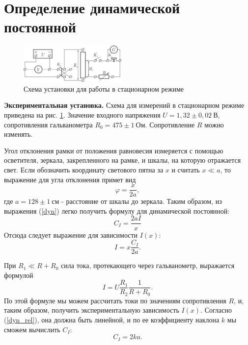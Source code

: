 \documentclass[12pt,a4paper]{article}
\begin{document}
\section{Определение динамической постоянной}
\begin{figure}
\centering\includegraphics[width = 0.47\textwidth]{Sch1}
\captionsetup{justification = centering}
\caption{Схема установки для работы в стационарном режиме \label{Fig2}}
\end{figure}
\textbf{Экспериментальная установка.} Схема для измерений в стационарном режиме приведена на рис. \ref{Fig2}. Значение входного напряжения $U = 1,32 \pm 0,02~\text{В}$, сопротивления гальванометра $R_0 = 475 \pm 1~\text{Ом}$. Сопротивление $R$ можно изменять.

Угол отклонения рамки от положения равновесия измеряется с помощью осветителя, зеркала, закрепленного на рамке, и шкалы, на которую отражается свет. Если обозначить координату светового пятна за $x$ и считать $x \ll a$, то выражение для угла отклонения примет вид
\begin{equation}
\varphi = \frac{x}{2a},
\end{equation}
где $a = 128 \pm 1~\text{см}$ - расстояние от шкалы до зеркала. Таким образом, из выражения (\ref{dyn}) легко получить формулу для динамической постоянной:
\begin{equation}
C_I = \frac{2aI}{x} 
\end{equation}
Отсюда следует выражение для зависимости $I(x)$:
\begin{equation}
I = x\frac{C_I}{2a}\label{dyn_rel}.
\end{equation}

При $R_1 \ll R + R_0$ сила тока, протекающего через гальванометр, выражается формулой
\begin{equation}
I = U\frac{R_1}{R_2}\frac{1}{R + R_0}.
\end{equation}
По этой формуле мы можем рассчитать токи по значениям сопротивления $R$, и, таким образом, получить экспериментальную зависимость $I(x)$. Согласно (\ref{dyn_rel}), она должна быть линейной, и по ее коэффициенту наклона $k$ мы сможем вычислить $C_I$:
\begin{equation}
C_I = 2ka.\label{dyn_exp}
\end{equation}
\medskip
\end{document}
